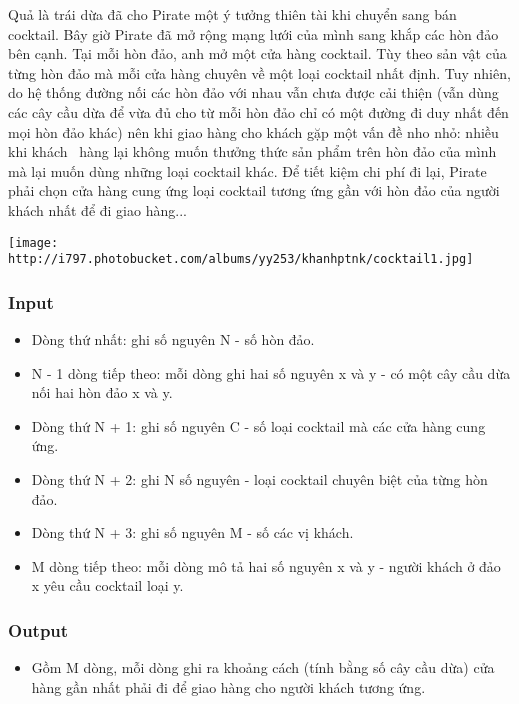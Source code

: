 



   Quả là trái dừa đã cho Pirate một ý tưởng thiên tài khi chuyển sang bán cocktail. Bây giờ Pirate đã mở rộng mạng lưới của mình sang khắp các hòn đảo bên cạnh. Tại mỗi hòn đảo, anh mở một cửa hàng cocktail. Tùy theo sản vật của từng hòn đảo mà mỗi cửa hàng chuyên về một loại cocktail nhất định. Tuy nhiên, do hệ thống đường nối các hòn đảo với nhau vẫn chưa được cải thiện (vẫn dùng các cây cầu dừa để vừa đủ cho từ mỗi hòn đảo chỉ có một đường đi duy nhất đến mọi hòn đảo khác) nên khi giao hàng cho khách gặp một vấn đề nho nhỏ: nhiều khi khách  hàng lại không muốn thưởng thức sản phẩm trên hòn đảo của mình mà lại muốn dùng những loại cocktail khác. Để tiết kiệm chi phí đi lại, Pirate phải chọn cửa hàng cung ứng loại cocktail tương ứng gần với hòn đảo của người khách nhất để đi giao hàng...  




\texttt{[image: http://i797.photobucket.com/albums/yy253/khanhptnk/cocktail1.jpg]}

\subsubsection{   Input  }
\begin{itemize}
	\item     Dòng thứ nhất: ghi số nguyên N - số hòn đảo.   
	\item     N - 1 dòng tiếp theo: mỗi dòng ghi hai số nguyên x và y - có một cây cầu dừa nối hai hòn đảo x và y.   
	\item     Dòng thứ N + 1: ghi số nguyên C - số loại cocktail mà các cửa hàng cung ứng.   
	\item     Dòng thứ N + 2: ghi N số nguyên - loại cocktail chuyên biệt của từng hòn đảo.   
	\item     Dòng thứ N + 3: ghi số nguyên M - số các vị khách.   
	\item     M dòng tiếp theo: mỗi dòng mô tả hai số nguyên x và y - người khách ở đảo x yêu cầu cocktail loại y.   
\end{itemize}

\subsubsection{   Output  }
\begin{itemize}
	\item     Gồm M dòng, mỗi dòng ghi ra khoảng cách (tính bằng số cây cầu dừa) cửa hàng gần nhất phải đi để giao hàng cho người khách tương ứng.   
\end{itemize}


